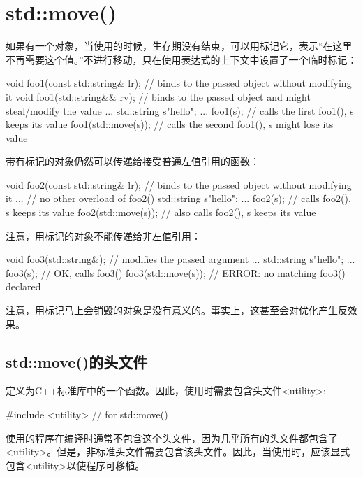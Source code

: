 \section{std::move()}
如果有一个对象，当使用的时候，生存期没有结束，可以用标记它，表示“在这里不再需要这个值。”不进行移动，只在使用表达式的上下文中设置了一个临时标记：

\begin{cppcode}
void foo1(const std::string& lr); // binds to the passed object without modifying it
void foo1(std::string&& rv); // binds to the passed object and might steal/modify the value
...
std::string s{"hello"};
...
foo1(s); // calls the first foo1(), s keeps its value
foo1(std::move(s)); // calls the second foo1(), s might lose its value
\end{cppcode}

带有标记的对象仍然可以传递给接受普通左值引用的函数：

\begin{cppcode}
void foo2(const std::string& lr); // binds to the passed object without modifying it
... // no other overload of foo2()
std::string s{"hello"};
...
foo2(s); // calls foo2(), s keeps its value
foo2(std::move(s)); // also calls foo2(), s keeps its value
\end{cppcode}

注意，用标记的对象不能传递给非左值引用：

\begin{cppcode}
void foo3(std::string&); // modifies the passed argument
...
std::string s{"hello"};
...
foo3(s); // OK, calls foo3()
foo3(std::move(s)); // ERROR: no matching foo3() declared
\end{cppcode}

注意，用标记马上会销毁的对象是没有意义的。事实上，这甚至会对优化产生反效果。

\subsection{std::move()的头文件}

定义为C++标准库中的一个函数。因此，使用时需要包含头文件<utility>:

\begin{cppcode}
#include <utility> // for std::move()
\end{cppcode}

使用的程序在编译时通常不包含这个头文件，因为几乎所有的头文件都包含了<utility>。但是，非标准头文件需要包含该头文件。因此，当使用时，应该显式包含<utility>以使程序可移植。

